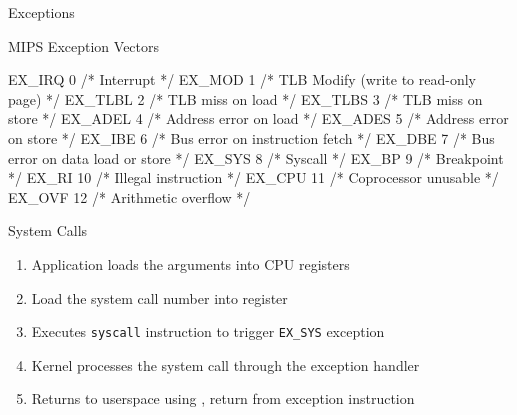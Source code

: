 \documentclass[11pt,aspectratio=169]{beamer}
\begin{document}
	\begin{slide}{Exceptions}
	\end{slide}
	
\begin{slide}{MIPS Exception Vectors}
\begin{ccode}
    EX_IRQ   0  /* Interrupt */
    EX_MOD   1  /* TLB Modify (write to read-only page) */
    EX_TLBL  2  /* TLB miss on load */
    EX_TLBS  3  /* TLB miss on store */
    EX_ADEL  4  /* Address error on load */
    EX_ADES  5  /* Address error on store */
    EX_IBE   6  /* Bus error on instruction fetch */
    EX_DBE   7  /* Bus error on data load or store */
    EX_SYS   8  /* Syscall */
    EX_BP    9  /* Breakpoint */
    EX_RI   10  /* Illegal instruction */
    EX_CPU  11  /* Coprocessor unusable */
    EX_OVF  12  /* Arithmetic overflow */
\end{ccode}
\end{slide}
	
	\begin{slide}{System Calls}
	\begin{enumerate}
	\item Application loads the arguments into CPU registers
	\item Load the system call number into register 
	\item Executes \texttt{syscall} instruction to trigger \texttt{EX\_SYS} 
	    exception
	\item Kernel processes the system call through the exception handler
	\item Returns to userspace using , return from exception 
	    instruction
	\end{enumerate}
	\end{slide}
	
\end{document}
